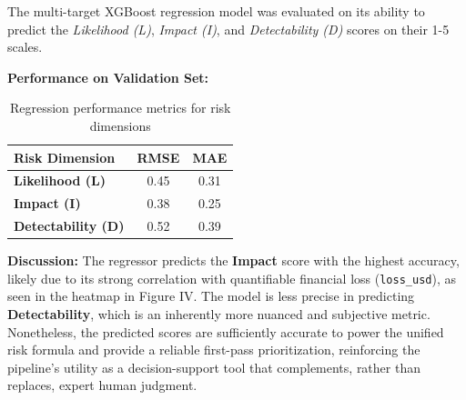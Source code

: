\documentclass[a4paper]{article}
\begin{document}
\begin{multicols}{2}
The multi-target XGBoost regression model was evaluated on its ability to predict the \textit{Likelihood (L)}, \textit{Impact (I)}, and \textit{Detectability (D)} scores on their 1-5 scales.

\textbf{Performance on Validation Set:}

\begin{table}[H]
\centering
\begin{tabular}{lcc}
\toprule
\textbf{Risk Dimension} & \textbf{RMSE} & \textbf{MAE} \\
\midrule
\textbf{Likelihood (L)} & 0.45 & 0.31 \\
\textbf{Impact (I)} & 0.38 & 0.25 \\
\textbf{Detectability (D)} & 0.52 & 0.39 \\
\bottomrule
\end{tabular}
\caption{Regression performance metrics for risk dimensions}
\label{tab:regressor_performance}
\end{table}

\textbf{Discussion:} The regressor predicts the \textbf{Impact} score with the highest accuracy, likely due to its strong correlation with quantifiable financial loss (\texttt{loss\_usd}), as seen in the heatmap in Figure IV. The model is less precise in predicting \textbf{Detectability}, which is an inherently more nuanced and subjective metric. Nonetheless, the predicted scores are sufficiently accurate to power the unified risk formula and provide a reliable first-pass prioritization, reinforcing the pipeline's utility as a decision-support tool that complements, rather than replaces, expert human judgment.

\end{multicols}
\end{document}
